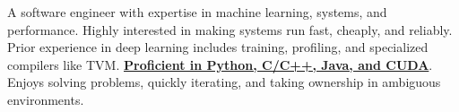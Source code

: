 \vspace{-1.0em}
\begin{cventries}
  \vspace{-1.0em}
  \cventry
    {}
    {}
    {}
    {}
    {
        A software engineer with expertise in machine learning, systems, and performance. Highly interested in making systems run fast, cheaply, and reliably. 
		Prior experience in deep learning includes training, profiling, and specialized compilers like TVM. 
		\underline{\textbf{Proficient in Python, C/C++, Java, and CUDA}}. Enjoys solving problems, quickly iterating, and taking ownership in ambiguous environments. 
    }

\end{cventries}